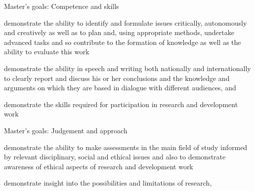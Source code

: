   \begin{block}{Master's goals: Competence and skills~\autocite{HEO2}}
      \item\label{C1} demonstrate the ability to identify and formulate issues 
        critically, autonomously and creatively as well as to plan and, using 
        appropriate methods, undertake advanced tasks
        and so contribute to the formation of knowledge as well as the ability 
        to evaluate this work
      \item\label{Ccomm} demonstrate the ability in speech and writing both 
        nationally and internationally to clearly report and discuss his or her 
        conclusions and the knowledge and arguments on which they are based in 
        dialogue with different audiences, and
      \item\label{C2} demonstrate the skills required for participation in 
        research and development work \textelp{}
  \end{block}

  \begin{block}{Master's goals: Judgement and approach~\autocite{HEO2}}
      \item\label{J1} demonstrate the ability to make assessments in the main 
        field of study informed by relevant disciplinary, social and ethical 
        issues and also to demonstrate awareness of ethical aspects of research 
        and development work
      \item\label{J2} demonstrate insight into the possibilities and 
        limitations of research, \textelp{}
  \end{block}


